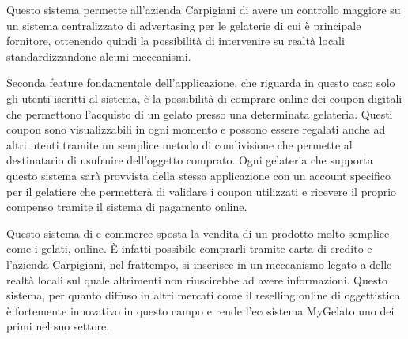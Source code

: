 Questo sistema permette all'azienda Carpigiani di avere un controllo
maggiore su un sistema centralizzato di advertasing per le gelaterie
di cui è principale fornitore, ottenendo quindi la possibilità di
intervenire su realtà locali standardizzandone alcuni meccanismi.\bigskip{}

Seconda feature fondamentale dell'applicazione, che riguarda in questo
caso solo gli utenti iscritti al sistema, è la possibilità di comprare
online dei coupon digitali che permettono l'acquisto di un gelato
presso una determinata gelateria. Questi coupon sono visualizzabili
in ogni momento e possono essere regalati anche ad altri utenti tramite
un semplice metodo di condivisione che permette al destinatario di
usufruire dell'oggetto comprato. Ogni gelateria che supporta questo
sistema sarà provvista della stessa applicazione con un account specifico
per il gelatiere che permetterà di validare i coupon utilizzati e
ricevere il proprio compenso tramite il sistema di pagamento online.\bigskip{}

Questo sistema di e-commerce sposta la vendita di un prodotto molto
semplice come i gelati, online. È infatti possibile comprarli tramite
carta di credito e l'azienda Carpigiani, nel frattempo, si inserisce
in un meccanismo legato a delle realtà locali sul quale altrimenti
non riuscirebbe ad avere informazioni. Questo sistema, per quanto
diffuso in altri mercati come il reselling online di oggettistica
è fortemente innovativo in questo campo e rende l'ecosistema MyGelato
uno dei primi nel suo settore.

\newpage{}

